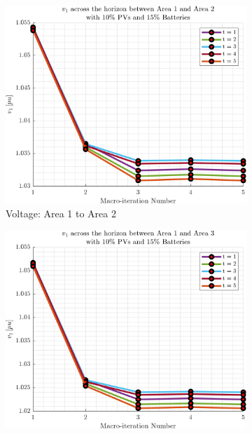 \documentclass[../../outputs/main.tex]{subfiles}
\begin{document}
\begin{figure}[h!]
    \begin{subfigure}[b]{0.3\textwidth}
        \centering
        \includegraphics[width=\textwidth]{../figures/T5-pv10-batt15-vBoundary/BoundaryVoltage_vs_t_vs_macroItr_5Areas_1_2_genCost_pv_10_batt_15_.png}
        \caption{Voltage: Area 1 to Area 2}
        \label{fig:voltage_1_2}
    \end{subfigure}
    \hfill
    \begin{subfigure}[b]{0.3\textwidth}
        \centering
        \includegraphics[width=\textwidth]{../figures/T5-pv10-batt15-vBoundary/BoundaryVoltage_vs_t_vs_macroItr_5Areas_1_3_genCost_pv_10_batt_15_.png}

\end{subfigure}
\end{figure}
\end{document}
